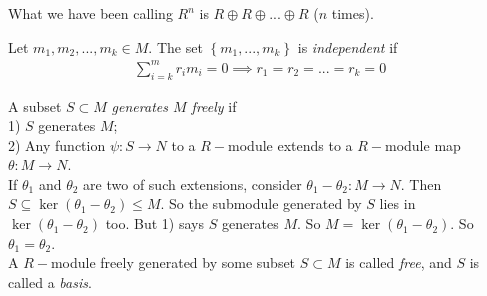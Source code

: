 \documentclass[a4paper]{article}
\begin{document}
\begin{eg}
What we have been calling $R^n$ is $R\oplus R\oplus...\oplus R$ ($n$ times).
\end{eg}

\begin{defi}
Let $m_1,m_2,...,m_k\in M$. The set $\left\{m_1,...,m_k\right\}$ is \emph{independent} if
\begin{equation*}
\begin{aligned}
\sum_{i=k}^m r_i m_i = 0 \implies r_1 = r_2 = ... = r_k = 0
\end{aligned}
\end{equation*}
\end{defi}

\begin{defi}
A subset $S \subset M$ \emph{generates $M$ freely} if\\
1) $S$ generates $M$;\\
2) Any function $\psi: S\to N$ to a $R-$module extends to a $R-$module map $\theta: M\to N$.\\
If $\theta_1$ and $\theta_2$ are two of such extensions, consider $\theta_1 - \theta_2 : M\to N$. Then $S\subseteq \ker\left(\theta_1 - \theta_2\right) \leq M$. So the submodule generated by $S$ lies in $\ker\left(\theta_1 - \theta_2\right)$ too. But 1) says $S$ generates $M$. So $M=\ker\left(\theta_1 - \theta_2\right)$. So $\theta_1 = \theta_2$.\\
A $R-$module freely generated by some subset $S\subset M$ is called \emph{free}, and $S$ is called a \emph{basis}.
\end{defi}
\end{document}
